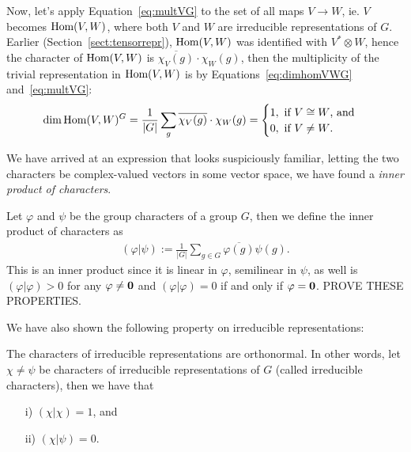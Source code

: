Now, let's apply Equation~\ref{eq:multVG} to the set of all maps $V \rightarrow W$, ie. $V$ becomes $\text{Hom} (V,W)$, where both $V$ and $W$ are irreducible representations of $G$. Earlier (Section~\ref{sect:tensorrepr}), $\text{Hom}(V,W)$ was identified with $V^* \otimes W$, hence the character of $\text{Hom}(V,W)$ is $\overline{\chi_V(g)}\cdot\chi_W(g)$, then the multiplicity of the trivial representation in $\text{Hom}(V,W)$ is by Equations~\ref{eq:dimhomVWG} and~\ref{eq:multVG}:
\begin{align*}
	\dim \text{Hom}(V,W)^G = \frac{1}{|G|} \sum_g \overline{\chi_V(g)}\cdot\chi_W(g) = \begin{cases}
		1, \text{ if $V \cong W$, and} \\
		0, \text{ if $V \neq W$.}
	\end{cases}
\end{align*}

We have arrived at an expression that looks suspiciously familiar, letting the two characters be complex-valued vectors in some vector space, we have found a \textit{inner product of characters}.

\begin{definition}
	Let $\varphi$ and $\psi$ be the group characters of a group $G$, then we define the inner product of characters as
	\begin{align*}
		(\varphi | \psi) := \frac{1}{|G|} \sum_{g \in G} \overline{\varphi(g)} {\psi(g)}.
	\end{align*}
	This is an inner product since it is linear in $\varphi$, semilinear in $\psi$, as well is $(\varphi|\varphi) > 0 $ for any $\varphi \neq \mathbf{0}$ and $(\varphi|\varphi)=0$ if and only if $\varphi= \mathbf{0}$. PROVE THESE PROPERTIES.
\end{definition}


We have also shown the following property on irreducible representations:

\begin{theorem}\label{thm:irredcrit}
	The characters of irreducible representations are orthonormal. In other words, let $\chi \neq \psi$ be characters of irreducible representations of $G$ (called irreducible characters), then we have that 
	\begin{enumerate}
		\item[i)] $(\chi|\chi)= 1$, and
		\item[ii)] $(\chi|\psi) = 0$.
	\end{enumerate}
\end{theorem}

